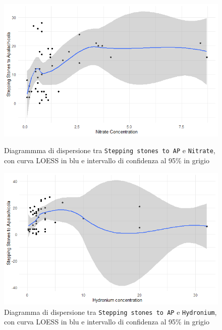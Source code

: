 \documentclass{article} %
\begin{document}
\begin{figure}[H]
    \centering
    \begin{minipage}{0.49\textwidth}
        \centering
        \includegraphics[width=\textwidth]{immagini/ap_nitrate.png}
        \captionsetup{justification=centering}
        \caption{Diagrammma di dispersione tra \texttt{Stepping stones to AP} e \texttt{Nitrate}, con curva LOESS in blu e intervallo di confidenza al 95\% in grigio}
    \end{minipage}
    \hfill
    \begin{minipage}{0.49\textwidth}
        \centering
        \includegraphics[width=\textwidth]{immagini/ap_hy.png}
        \captionsetup{justification=centering}
        \caption{Diagramma di dispersione tra \texttt{Stepping stones to AP} e \texttt{Hydronium}, con curva LOESS in blu e intervallo di confidenza al 95\% in grigio}
    \end{minipage}
\end{figure}
\end{document}
